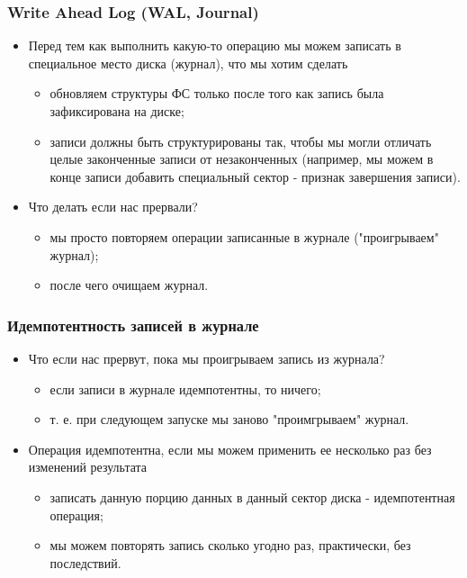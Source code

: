 \begin{frame}
\frametitle{Write Ahead Log (WAL, Journal)}
\begin{itemize}
  \item Перед тем как выполнить какую-то операцию мы можем записать в
  специальное место диска (журнал), что мы хотим сделать
  \begin{itemize}
    \item обновляем структуры ФС только после того как запись была
    зафиксирована на диске;
    \item записи должны быть структурированы так, чтобы мы могли отличать целые
    законченные записи от незаконченных (например, мы можем в конце записи
    добавить специальный сектор - признак завершения записи).
  \end{itemize}
  \item Что делать если нас прервали?
  \begin{itemize}
    \item мы просто повторяем операции записанные в журнале ("проигрываем"
    журнал);
    \item после чего очищаем журнал.
  \end{itemize}
\end{itemize}
\end{frame}

\begin{frame}
\frametitle{Идемпотентность записей в журнале}
\begin{itemize}
  \item Что если нас прервут, пока мы проигрываем запись из журнала?
  \begin{itemize}
    \item если записи в журнале идемпотентны, то ничего;
    \item т. е. при следующем запуске мы заново "проимгрываем" журнал.
  \end{itemize}
  \item Операция идемпотентна, если мы можем применить ее несколько раз без
  изменений результата
  \begin{itemize}
    \item записать данную порцию данных в данный сектор диска - идемпотентная
    операция;
    \item мы можем повторять запись сколько угодно раз, практически, без
    последствий.
  \end{itemize}
\end{itemize}
\end{frame}

